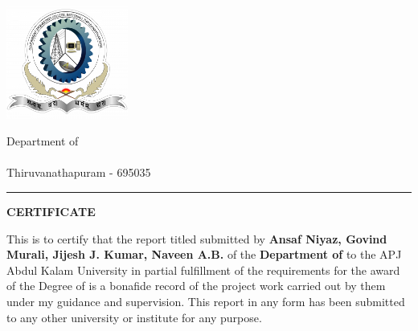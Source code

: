 \thispagestyle{plain}
\noindent
\begin{minipage}{0.30\textwidth}
\includegraphics[width=40mm]{logo.png}
\end{minipage}
\begin{minipage}{0.70\textwidth}

 Department of \Department \\
 \University \\
 Thiruvanathapuram - 695035
\end{minipage}

\vspace{0.5\baselineskip}
\hrule
\vspace{2\baselineskip}

\begin{center}
{\Large {\bf \uppercase{Certificate}}}
\end{center}

\vspace{\baselineskip}

\noindent 

This is to certify that the report titled {\bf \ReportTitle}submitted by {\bf Ansaf Niyaz, Govind Murali, Jijesh J. Kumar, Naveen A.B.} of the {\bf Department of \Department} to the APJ Abdul Kalam
University in partial fulfillment of the requirements for the award of the Degree of \emph{\Degree} is a bonafide record of the project work
carried out by them under my guidance and supervision. This report in any form has been
submitted
to
any
other
university
or
institute
for
any
purpose.

